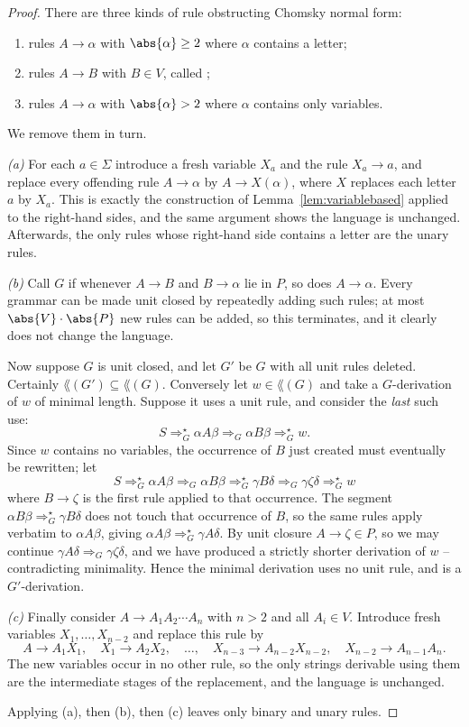 \begin{proof}
	There are three kinds of rule obstructing Chomsky normal form:
	\begin{enumerate}[label=(\alph*)]
		\item rules $A \to \alpha$ with $\abs{\alpha} \geq 2$ where $\alpha$ contains a letter;
		\item rules $A \to B$ with $B \in V$, called ;
		\item rules $A \to \alpha$ with $\abs{\alpha} > 2$ where $\alpha$ contains only variables.
	\end{enumerate}
	We remove them in turn.

	\emph{(a)} For each $a \in \Sigma$ introduce a fresh variable $X_a$ and the rule $X_a \to a$, and replace every offending rule $A \to \alpha$ by $A \to X(\alpha)$, where $X$ replaces each letter $a$ by $X_a$. This is exactly the construction of Lemma~\ref{lem:variablebased} applied to the right-hand sides, and the same argument shows the language is unchanged. Afterwards, the only rules whose right-hand side contains a letter are the unary rules.

	\emph{(b)} Call $G$  if whenever $A \to B$ and $B \to \alpha$ lie in $P$, so does $A \to \alpha$. Every grammar can be made unit closed by repeatedly adding such rules; at most $\abs{V}\cdot\abs{P}$ new rules can be added, so this terminates, and it clearly does not change the language.

	Now suppose $G$ is unit closed, and let $G'$ be $G$ with all unit rules deleted. Certainly $\lang(G') \subseteq \lang(G)$. Conversely let $w \in \lang(G)$ and take a $G$-derivation of $w$ of minimal length. Suppose it uses a unit rule, and consider the \emph{last} such use:
	$$S \Rightarrow_G^\star \alpha A\beta \Rightarrow_G \alpha B \beta \Rightarrow_G^\star w.$$
	Since $w$ contains no variables, the occurrence of $B$ just created must eventually be rewritten; let
	$$S \Rightarrow_G^\star \alpha A\beta \Rightarrow_G \alpha B\beta \Rightarrow_G^\star \gamma B \delta \Rightarrow_G \gamma\zeta\delta \Rightarrow_G^\star w$$
	where $B \to \zeta$ is the first rule applied to that occurrence. The segment $\alpha B \beta \Rightarrow^\star_G \gamma B \delta$ does not touch that occurrence of $B$, so the same rules apply verbatim to $\alpha A \beta$, giving $\alpha A \beta \Rightarrow_G^\star \gamma A \delta$. By unit closure $A \to \zeta \in P$, so we may continue $\gamma A \delta \Rightarrow_G \gamma \zeta \delta$, and we have produced a strictly shorter derivation of $w$ -- contradicting minimality. Hence the minimal derivation uses no unit rule, and is a $G'$-derivation.

	\emph{(c)} Finally consider $A \to A_1A_2\cdots A_n$ with $n > 2$ and all $A_i \in V$. Introduce fresh variables $X_1, \dots, X_{n-2}$ and replace this rule by
	$$A \to A_1X_1, \quad X_1 \to A_2X_2, \quad \dots, \quad X_{n-3}\to A_{n-2}X_{n-2}, \quad X_{n-2} \to A_{n-1}A_n.$$
	The new variables occur in no other rule, so the only strings derivable using them are the intermediate stages of the replacement, and the language is unchanged.

	Applying (a), then (b), then (c) leaves only binary and unary rules.
\end{proof}
